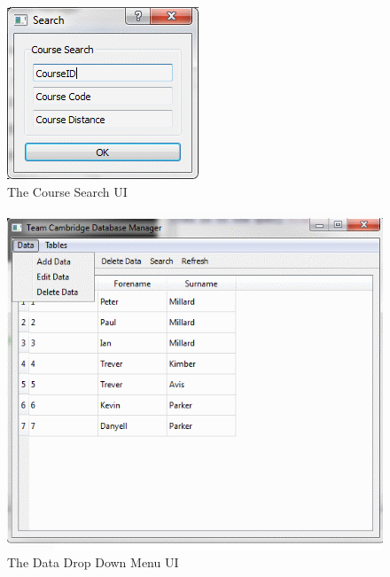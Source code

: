 \begin{figure}
\includegraphics[width=\textwidth]{./Maintenance/UI/CourseSearch.png}
\caption{The Course Search UI} \label{fig:CourseSearch_UI}
\end{figure}

\begin{figure}
\includegraphics[width=\textwidth]{./Maintenance/UI/DataDrop.png}
\caption{The Data Drop Down Menu UI} \label{fig:DataDrop_UI}
\end{figure}

